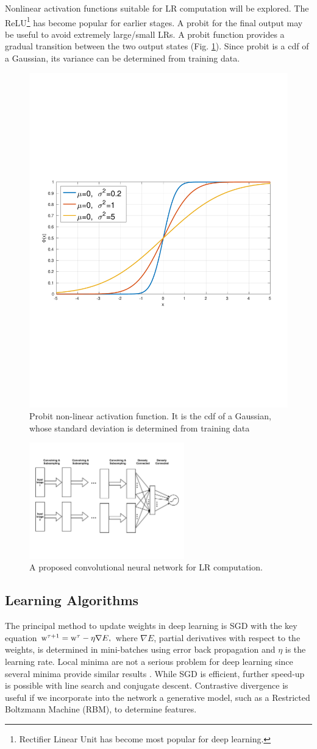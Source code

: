 \documentclass[11pt, doublespacing]{article}
\begin{document}
Nonlinear activation functions suitable for LR computation will be explored. The ReLU\footnote{Rectifier Linear Unit has become most popular for deep learning.} has become popular for earlier stages. A  probit for the final output  may be useful to avoid extremely large/small LRs. 
A probit function provides a gradual transition between the two output states (Fig. \ref{fig:Probit}). Since probit is a cdf of a Gaussian, its variance can be determined from training data. 
 \begin{figure}
 \centering
 \includegraphics[width=0.3\linewidth]{Figures/Probit.pdf}
 \caption{Probit non-linear activation function. It is the cdf of a Gaussian, whose standard deviation is determined from training data}
  \label{fig:Probit}
 \end{figure}



\begin{figure}
\centering
\includegraphics[width=0.6\textwidth]{Figures/cnn}
\caption{A proposed convolutional neural network  for  LR computation.}
\label{fig:cnn}
\end{figure}




 \subsection{Learning Algorithms}
 
The principal method to update weights  in deep learning is SGD with the key equation
$
{\boldmath {\mathrm w}}^{\tau +1}={\boldmath {\mathrm w}}^{\tau }-\eta \nabla E, 
$
where $\nabla E$, partial derivatives with respect to the weights,  is determined in mini-batches using error back propagation and $\eta$ is the learning rate. Local minima are not a serious problem for deep learning since several minima provide similar results \cite{LeCun2015}. While SGD is efficient, further speed-up is possible with  line search and conjugate descent. Contrastive divergence is useful  if we  incorporate into the network a generative model, such as a Restricted Boltzmann Machine (RBM), to determine features. 
\end{document}
